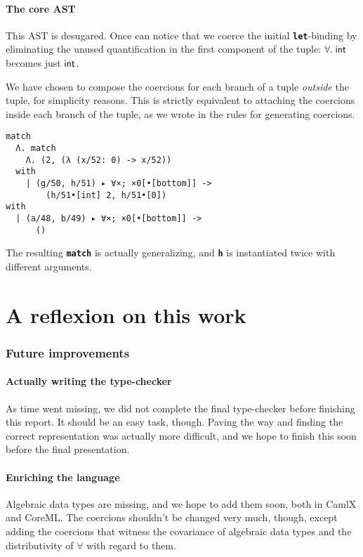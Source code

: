 \documentclass[10pt,a4paper,twoside,titlepage,twocolumn]{article}
\newcommand{\code}[1]{\textbf{\texttt{#1}}}
\begin{document}
\subsection{The core AST}

This AST is desugared. Once can notice that we coerce the initial
\code{let}-binding by eliminating the unused quantification in the first
component of the tuple: $\forall.\;\text{\textsf{int}}$ becomes just $\text{\textsf{int}}$.

We have chosen to compose the coercions for each branch of a tuple
\emph{outside} the tuple, for simplicity reasons. This is strictly equivalent to
attaching the coercions inside each branch of the tuple, as we wrote in the
rules for generating coercions.

\begin{verbatim}
match
  Λ. match
    Λ. (2, (λ (x/52: 0) -> x/52))
  with
    | (g/50, h/51) ▸ ∀×; ×0[•[bottom]] ->
        (h/51•[int] 2, h/51•[0])
with
  | (a/48, b/49) ▸ ∀×; ×0[•[bottom]] ->
      ()
\end{verbatim}

The resulting \code{match} is actually generalizing, and \code{h} is
instantiated twice with different arguments.

\part{A reflexion on this work}

\section{Future improvements}

\subsection{Actually writing the type-checker}

As time went missing, we did not complete the final type-checker before
finishing this report. It should be an easy task, though. Paving the way and
finding the correct representation was actually more difficult, and we hope to
finish this soon before the final presentation.

\subsection{Enriching the language}

Algebraic data types are missing, and we hope to add them soon, both in CamlX
and CoreML. The coercions shouldn't be changed very much, though, except adding
the coercions that witness the covariance of algebraic data types and the
distributivity of $\forall$ with regard to them.
\end{document}
